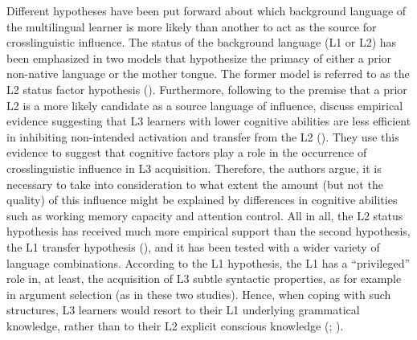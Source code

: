 \documentclass[output=paper,colorlinks,citecolor=brown,nonflat]{langsci/langscibook}
\begin{document}
Different hypotheses have been put forward about which background language of the multilingual learner is more likely than another to act as the source for crosslinguistic influence. The status of the background language (L1 or L2) has been emphasized in two models that hypothesize the primacy of either a prior non-native language or the mother tongue. The former model is referred to as the L2 status factor hypothesis (\citealt{BardelFalk2007, BardelFalk2012, FalkBardel2010, BardelSánchez2017}). Furthermore, following to the premise that a prior L2 is a more likely candidate as a source language of influence, \citet{BardelSánchez2017} discuss empirical evidence suggesting that L3 learners with lower cognitive abilities are less efficient in inhibiting non-intended activation and transfer from the L2 (\citealt{SánchezBardel2016, Sánchez2019Complexity}). They use this evidence to suggest that cognitive factors play a role in the occurrence of crosslinguistic influence in L3 acquisition. Therefore, the authors argue, it is necessary to take into consideration to what extent the amount (but not the quality) of this influence might be explained by differences in cognitive abilities such as working memory capacity and attention control. All in all, the L2 status hypothesis has received much more empirical support than the second hypothesis, the L1 transfer hypothesis (\citealt{NaRanongLeung2009, Hermas2010}), and it has been tested with a wider variety of language combinations. According to the L1 hypothesis, the L1 has a “privileged” role in, at least, the acquisition of L3 subtle syntactic properties, as for example in argument selection (as in these two studies). Hence, when coping with such structures, L3 learners would resort to their L1 underlying grammatical knowledge, rather than to their L2 explicit conscious knowledge (\citealt[185]{NaRanongLeung2009}; \citealt[358]{Hermas2010}).
\end{document}
